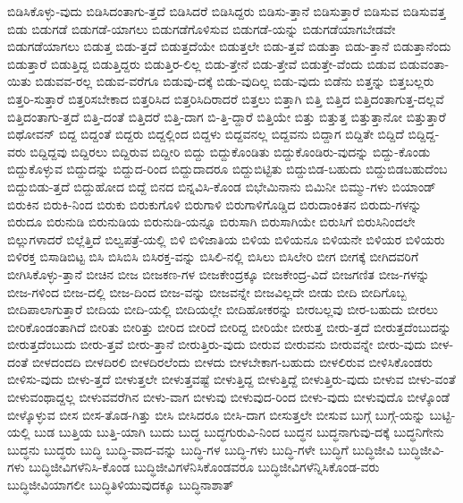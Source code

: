 {ಬಿಡಿಸಿಕೊಳ್ಳು-ವುದು
ಬಿಡಿಸಿದಂತಾಗು-ತ್ತದೆ
ಬಿಡಿಸಿದರೆ
ಬಿಡಿಸಿದ್ದರು
ಬಿಡಿಸು-ತ್ತಾನೆ
ಬಿಡಿಸುತ್ತಾರೆ
ಬಿಡಿಸುವ
ಬಿಡಿಸುವತ್ತ
ಬಿಡು
ಬಿಡುಗಡೆ
ಬಿಡುಗಡೆ-ಯಾಗಲು
ಬಿಡುಗಡೆಗೊಳಿಸುವ
ಬಿಡುಗಡೆ-ಯನ್ನು
ಬಿಡುಗಡೆಯಾಗಬೇಡವೇ
ಬಿಡುಗಡೆಯಾಗಲು
ಬಿಡುತ್ತ
ಬಿಡು-ತ್ತದೆ
ಬಿಡುತ್ತದೆಯೇ
ಬಿಡುತ್ತಲೇ
ಬಿಡು-ತ್ತವೆ
ಬಿಡುತ್ತಾ
ಬಿಡು-ತ್ತಾನೆ
ಬಿಡುತ್ತಾನೆಂದು
ಬಿಡುತ್ತಾರೆ
ಬಿಡುತ್ತಿದ್ದ
ಬಿಡುತ್ತಿದ್ದರು
ಬಿಡುತ್ತಿರ-ಲಿಲ್ಲ
ಬಿಡು-ತ್ತೇನೆ
ಬಿಡು-ತ್ತೇವೆ
ಬಿಡುತ್ತೇ-ವೆಂದು
ಬಿಡುವ
ಬಿಡುವಂತಾ-ಯಿತು
ಬಿಡುವವ-ರಲ್ಲ
ಬಿಡುವ-ವರೆಗೂ
ಬಿಡುವು-ದಕ್ಕೆ
ಬಿಡು-ವುದಿಲ್ಲ
ಬಿಡು-ವುದು
ಬಿಡೆನು
ಬಿತ್ತನ್ನು
ಬಿತ್ತಬಲ್ಲರು
ಬಿತ್ತರಿ-ಸುತ್ತಾರೆ
ಬಿತ್ತರಿಸಬೇಕಾದ
ಬಿತ್ತರಿಸಿದ
ಬಿತ್ತರಿಸಿದಿರಾದರೆ
ಬಿತ್ತಲು
ಬಿತ್ತಾಗಿ
ಬಿತ್ತಿ
ಬಿತ್ತಿದ
ಬಿತ್ತಿದಂತಾಗುತ್ತ-ದಲ್ಲವೆ
ಬಿತ್ತಿದಂತಾಗು-ತ್ತದೆ
ಬಿತ್ತಿ-ದಂತೆ
ಬಿತ್ತಿದರೆ
ಬಿತ್ತಿ-ದಾಗ
ಬಿ-ತ್ತಿ-ದ್ದಾರೆ
ಬಿತ್ತಿಯೇ
ಬಿತ್ತು
ಬಿತ್ತುತ್ತ
ಬಿತ್ತುತ್ತಾನೋ
ಬಿತ್ತುತ್ತಾರೆ
ಬಿಥೋವನ್
ಬಿದ್ದ
ಬಿದ್ದಂತೆ
ಬಿದ್ದರು
ಬಿದ್ದಲ್ಲಿಂದ
ಬಿದ್ದಳು
ಬಿದ್ದವನಲ್ಲ
ಬಿದ್ದವನು
ಬಿದ್ದಾಗ
ಬಿದ್ದಿತೇ
ಬಿದ್ದಿದೆ
ಬಿದ್ದಿದ್ದ-ವರು
ಬಿದ್ದಿದ್ದವು
ಬಿದ್ದಿರಲು
ಬಿದ್ದಿರುವ
ಬಿದ್ದೀರಿ
ಬಿದ್ದು
ಬಿದ್ದುಕೊಂಡಿತು
ಬಿದ್ದುಕೊಂಡಿರು-ವುದನ್ನು
ಬಿದ್ದು-ಕೊಂಡು
ಬಿದ್ದುಕೊಳ್ಳುವ
ಬಿದ್ದುದನ್ನು
ಬಿದ್ದುದ-ರಿಂದ
ಬಿದ್ದುದಾದರೂ
ಬಿದ್ದುಬಿಟ್ಟಿತು
ಬಿದ್ದುಬಿಡ-ಬಹುದು
ಬಿದ್ದುಬಿಡಬಹುದೆಂಬ
ಬಿದ್ದುಬಿಡು-ತ್ತದೆ
ಬಿದ್ದುಹೋದ
ಬಿದ್ದೆ
ಬಿನದ
ಬಿನ್ನವಿಸಿ-ಕೊಂಡ
ಬಿಭೇಮಿನಾನು
ಬಿಮಿನೀ
ಬಿಮ್ಮು-ಗಳು
ಬಿಯಾಂಡ್
ಬಿರುಕಿನ
ಬಿರುಕಿ-ನಿಂದ
ಬಿರುಕು
ಬಿರುಕುಗೊಳಿ
ಬಿರುಗಾಳಿ
ಬಿರುಗಾಳಿಗೊಡ್ಡಿದ
ಬಿರುದಾಂಕಿತನ
ಬಿರುದು-ಗಳನ್ನು
ಬಿರುದೂ
ಬಿರುನುಡಿ
ಬಿರುನುಡಿಯ
ಬಿರುನುಡಿ-ಯನ್ನೂ
ಬಿರುಸಾಗಿ
ಬಿರುಸಾಗಿಯೇ
ಬಿರುಸಿಗೆ
ಬಿರುಸಿನಿಂದಲೇ
ಬಿಲ್ಲುಗಳಾದರೆ
ಬಿಲ್ಲೆತ್ತಿದೆ
ಬಿಲ್ವಪತ್ರೆ-ಯಲ್ಲಿ
ಬಿಳಿ
ಬಿಳಿಜಾತಿಯ
ಬಿಳಿಯ
ಬಿಳಿಯನೂ
ಬಿಳಿಯನೇ
ಬಿಳಿಯರ
ಬಿಳಿಯರು
ಬಿಳಿರಕ್ತ
ಬಿಸಾಡಿಬಿಟ್ಟ
ಬಿಸಿ
ಬಿಸಿಬಿಸಿ
ಬಿಸಿರಕ್ತ-ವನ್ನು
ಬಿಸಿಲಿ-ನಲ್ಲಿ
ಬಿಸಿಲು
ಬಿಸಿಲೇರಿ
ಬೀಗ
ಬೀಗಕ್ಕೆ
ಬೀಗಿದವರಿಗೆ
ಬೀಗಿಸಿಕೊಳ್ಳು-ತ್ತಾನೆ
ಬೀಚಿನ
ಬೀಜ
ಬೀಜಕಣ-ಗಳ
ಬೀಜಕೇಂದ್ರಕ್ಕೂ
ಬೀಜಕೇಂದ್ರ-ವಿದೆ
ಬೀಜಗಣಿತ
ಬೀಜ-ಗಳನ್ನು
ಬೀಜ-ಗಳಿಂದ
ಬೀಜ-ದಲ್ಲಿ
ಬೀಜ-ದಿಂದ
ಬೀಜ-ವನ್ನು
ಬೀಜವನ್ನೇ
ಬೀಜವಿಲ್ಲದೇ
ಬೀಡು
ಬೀದಿ
ಬೀದಿಗೊಬ್ಬ
ಬೀದಿಪಾಲಾಗುತ್ತಾರೆ
ಬೀದಿಯ
ಬೀದಿ-ಯಲ್ಲಿ
ಬೀದಿಯಲ್ಲೇ
ಬೀದಿಹೋಕರನ್ನು
ಬೀರಬಲ್ಲವು
ಬೀರ-ಬಹುದು
ಬೀರಲು
ಬೀರಿಕೊಂಡಂತಾಗಿದೆ
ಬೀರಿತು
ಬೀರಿತ್ತು
ಬೀರಿದ
ಬೀರಿದೆ
ಬೀರಿದ್ದ
ಬೀರಿಯೇ
ಬೀರುತ್ತ
ಬೀರು-ತ್ತದೆ
ಬೀರುತ್ತದೆಂಬುದನ್ನು
ಬೀರುತ್ತದೆಂಬುದು
ಬೀರು-ತ್ತವೆ
ಬೀರು-ತ್ತಾನೆ
ಬೀರುತ್ತಿರು-ವುದು
ಬೀರುವ
ಬೀರುವನು
ಬೀರುವನ್ನೇ
ಬೀರು-ವುದು
ಬೀಳ-ದಂತೆ
ಬೀಳದಂದದಿ
ಬೀಳದಿರಲಿ
ಬೀಳದಿರಲೆಂದು
ಬೀಳದು
ಬೀಳಬೇಕಾಗ-ಬಹುದು
ಬೀಳಲಿರುವ
ಬೀಳಿಸಿಕೊಂಡರು
ಬೀಳಿಸು-ವುದು
ಬೀಳು-ತ್ತದೆ
ಬೀಳುತ್ತಲೇ
ಬೀಳುತ್ತವಷ್ಟೆ
ಬೀಳುತ್ತಿದ್ದ
ಬೀಳುತ್ತಿದ್ದೆ
ಬೀಳುತ್ತಿರು-ವುದು
ಬೀಳುವ
ಬೀಳು-ವಂತೆ
ಬೀಳುವಂಥಾದ್ದಲ್ಲ
ಬೀಳುವವರೆಗಿನ
ಬೀಳು-ವಾಗ
ಬೀಳುವು
ಬೀಳುವುದ-ರಿಂದ
ಬೀಳು-ವುದು
ಬೀಳುವುದೊ
ಬೀಳ್ಕೊಂಡೆ
ಬೀಳ್ಕೊಳ್ಳುವ
ಬೀಸ
ಬೀಸ-ತೊಡ-ಗಿತ್ತು
ಬೀಸಿ
ಬೀಸಿದರೂ
ಬೀಸಿ-ದಾಗ
ಬೀಸುತ್ತಲೇ
ಬೀಸುವ
ಬುಗ್ಗೆ
ಬುಗ್ಗೆ-ಯನ್ನು
ಬುಟ್ಟಿ-ಯಲ್ಲಿ
ಬುಡ
ಬುತ್ತಿಯ
ಬುತ್ತಿ-ಯಾಗಿ
ಬುದು
ಬುದ್ಧ
ಬುದ್ಧಗುರುವಿ-ನಿಂದ
ಬುದ್ಧನ
ಬುದ್ಧನಾಗುವು-ದಕ್ಕೆ
ಬುದ್ಧನಿಗೇನು
ಬುದ್ಧನು
ಬುದ್ಧರು
ಬುದ್ಧಿ
ಬುದ್ಧಿ-ವಾದ-ವನ್ನು
ಬುದ್ಧಿ-ಗಳ
ಬುದ್ಧಿ-ಗಳು
ಬುದ್ಧಿ-ಗಳೇ
ಬುದ್ಧಿಗೆ
ಬುದ್ಧಿಜೀವಿ
ಬುದ್ಧಿಜೀವಿ-ಗಳು
ಬುದ್ಧಿಜೀವಿಗಳೆನಿಸಿ-ಕೊಂಡ
ಬುದ್ಧಿಜೀವಿಗಳೆನಿಸಿಕೊಂಡವರೂ
ಬುದ್ಧಿಜೀವಿಗಳೆನ್ನಿಸಿಕೊಂಡ-ವರು
ಬುದ್ಧಿಜೀವಿಯಾಗಲೀ
ಬುದ್ಧಿತಿಳಿಯುವುದಕ್ಕೂ
ಬುದ್ಧಿನಾಶಾತ್
}
